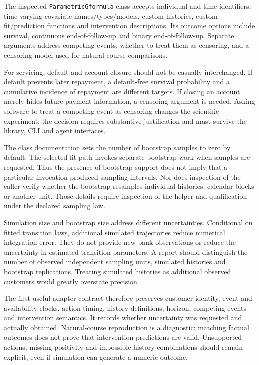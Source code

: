 The inspected \texttt{ParametricGformula} class accepts individual and time
identifiers, time-varying covariate names/types/models, custom histories, custom
fit/prediction functions and intervention descriptions. Its outcome options
include survival, continuous end-of-follow-up and binary end-of-follow-up.
Separate arguments address competing events, whether to treat them as censoring,
and a censoring model used for natural-course comparisons.\cite{v13_sw_pygformula}

For servicing, default and account closure should not be casually interchanged.
If default prevents later repayment, a default-free survival probability and a
cumulative incidence of repayment are different targets. If closing an account
merely hides future payment information, a censoring argument is needed. Asking
software to treat a competing event as censoring changes the scientific
experiment; the decision requires substantive justification and must survive
the library, CLI and agent interfaces.

The class documentation sets the number of bootstrap samples to zero by
default. The selected fit path invokes separate bootstrap work when samples
are requested. Thus the presence of bootstrap support does not imply that a
particular invocation produced sampling intervals. Nor does inspection of the
caller verify whether the bootstrap resamples individual histories, calendar
blocks or another unit. Those details require inspection of the helper and
qualification under the declared sampling law.\cite{v13_sw_pygformula}

Simulation size and bootstrap size address different uncertainties. Conditional
on fitted transition laws, additional simulated trajectories reduce numerical
integration error. They do not provide new bank observations or reduce the
uncertainty in estimated transition parameters. A report should distinguish
the number of observed independent sampling units, simulated histories and
bootstrap replications. Treating simulated histories as additional observed
customers would greatly overstate precision.

The first useful adapter contract therefore preserves customer identity, event
and availability clocks, action timing, history definitions, horizon, competing
events and intervention semantics. It records whether uncertainty was requested
and actually obtained. Natural-course reproduction is a diagnostic: matching
factual outcomes does not prove that intervention predictions are valid.
Unsupported actions, missing positivity and impossible history combinations
should remain explicit, even if simulation can generate a numeric outcome.

